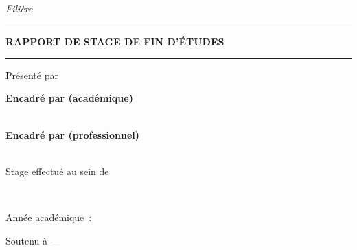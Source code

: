 \begin{titlepage}
    \centering
    \thispagestyle{empty}

    {\Large\bfseries \ecole\par}
    {\small \ecoleComplet\par}
    \vspace{0.3cm}
    {\itshape \cycle \\ Filière \filiere\par}

    \vspace{2cm}
    \rule{0.8\textwidth}{0.6pt}\par
    \vspace{0.5cm}
    {\bfseries\Large RAPPORT DE STAGE DE FIN D'ÉTUDES\par}
    \vspace{0.5cm}
    \rule{0.8\textwidth}{0.6pt}\par

    \vspace{1.2cm}
    {\Large\bfseries\color{bleuinstitutionnel} \titreRapport \par}

    \vspace{1.5cm}
    {\large Présenté par\par}
    {\Large\bfseries \etudiant\par}

    \vspace{1.5cm}
    \begin{minipage}{0.45\textwidth}
        \begin{flushleft}
            \small
            \textbf{Encadré par (académique)}\\
            \encadreurAcademique\\
            \encadreurAcademiqueTitre
        \end{flushleft}
    \end{minipage}
    \hfill
    \begin{minipage}{0.45\textwidth}
        \begin{flushright}
            \small
            \textbf{Encadré par (professionnel)}\\
            \maitreDeStage\\
            \maitreDeStageTitre
        \end{flushright}
    \end{minipage}

    \vspace{1.8cm}
    {\small Stage effectué au sein de\par}
    {\bfseries \structureAccueil\\ \paysStructure\par}
    {\small \periodeStage\par}

    \vfill
    {\small Année académique~: \anneeAcademique\par}
    {\small Soutenu à \villeSoutenance{} — \dateSoutenance\par}
\end{titlepage}
